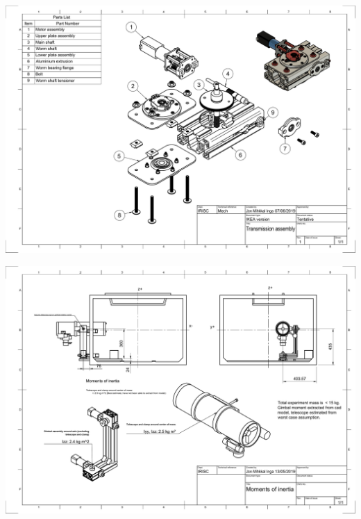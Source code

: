 \begin{landscape}
\includegraphics[scale=0.5]{appendix/img/mechanical_sketches/Transmission_Assembly.pdf}

\includegraphics[scale=0.5]{appendix/img/mechanical_sketches/Moments.pdf}

\end{landscape}
\newpage
% 


